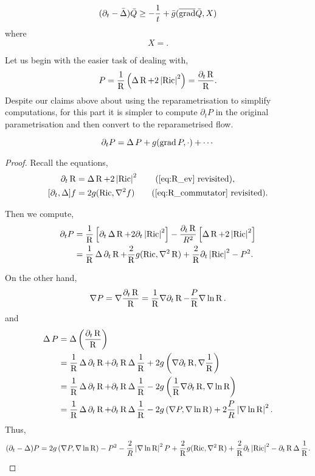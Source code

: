 \documentclass{amsart}
\begin{document}
\begin{prop}
\label{prop:Q_maxprinciple}
\[
(\partial_t - \bar{\Delta}) \bar{Q} \geq - \frac{1}{t} + \bar{g}(\overline{\operatorname{grad}} \bar{Q}, X)
\]
where
\[
X = .
\]
\end{prop}

Let us begin with the easier task of dealing with,
\[
P = \frac{1}{\operatorname{R}} \left(\operatorname{\Delta} \operatorname{R} + 2\left|{\operatorname{Ric}}\right|^2\right) = \frac{\partial_t \operatorname{R}}{\operatorname{R}}.
\]
Despite our claims above about using the reparametrisation to simplify computations, for this part it is simpler to compute \(\partial_t P\) in the original parametrisation and then convert to the reparametrised flow.

\begin{lemma}
\label{lem:dtP}
\[
\partial_t P = \operatorname{\Delta} P + g(\operatorname{grad} P, \cdot) + \cdots
\]
\end{lemma}

\begin{proof}
Recall the equations,
\begin{align*}
\partial_t \R &= \laplace \R + 2 \abs{\ric}^2 \tag{\ref{eq:R_ev} revisited}, \\
[\partial_t, \laplace] f &= 2 g(\ric, \nabla^2 f) \tag{\ref{eq:R_commutator} revisited}.
\end{align*}

Then we compute,
\[
\begin{split}
\partial_t P &= \frac{1}{\operatorname{R}} \left[\partial_t \operatorname{\Delta} \operatorname{R} + 2 \partial_t \left|{\operatorname{Ric}}\right|^2\right] - \frac{\partial_t \operatorname{R}}{R^2} \left[\operatorname{\Delta} \operatorname{R} + 2 \left|{\operatorname{Ric}}\right|^2\right] \\
&= \frac{1}{\operatorname{R}} \operatorname{\Delta} \partial_t \operatorname{R} + \frac{2}{\operatorname{R}} g(\operatorname{Ric}, \nabla^2 \operatorname{R}) + \frac{2}{\operatorname{R}} \partial_t \left|{\operatorname{Ric}}\right|^2 - P^2.
\end{split}
\]

On the other hand,
\[
\nabla P = \nabla \frac{\partial_t \operatorname{R}}{\operatorname{R}} = \frac{1}{\operatorname{R}} \nabla \partial_t \operatorname{R} - \frac{P}{\operatorname{R}} \nabla \ln \operatorname{R}.
\]
and
\[
\begin{split}
\operatorname{\Delta} P &= \operatorname{\Delta} \left(\frac{\partial_t \operatorname{R}}{\operatorname{R}}\right) \\
&= \frac{1}{\operatorname{R}} \operatorname{\Delta} \partial_t \operatorname{R} + \partial_t \operatorname{R} \operatorname{\Delta} \frac{1}{\operatorname{R}} + 2 g\left(\nabla \partial_t \operatorname{R}, \nabla \frac{1}{\operatorname{R}}\right) \\
&= \frac{1}{\operatorname{R}} \operatorname{\Delta} \partial_t \operatorname{R} + \partial_t \operatorname{R} \operatorname{\Delta} \frac{1}{\operatorname{R}} - 2 g\left(\frac{1}{\operatorname{R}} \nabla \partial_t \operatorname{R}, \nabla \ln \operatorname{R}\right) \\
&= \frac{1}{\operatorname{R}} \operatorname{\Delta} \partial_t \operatorname{R} + \partial_t \operatorname{R} \operatorname{\Delta} \frac{1}{\operatorname{R}} - 2 g\left(\nabla P, \nabla \ln \operatorname{R}\right) + 2\frac{P}{R} \left|{\nabla \ln \operatorname{R}}\right|^2.
\end{split}
\]
Thus,
\[
(\partial_t - \operatorname{\Delta}) P = 2 g\left(\nabla P, \nabla \ln \operatorname{R}\right) - P^2 - \frac{2}{R} \left|{\nabla \ln \operatorname{R}}\right|^2 P + \frac{2}{\operatorname{R}} g(\operatorname{Ric}, \nabla^2 \operatorname{R}) + \frac{2}{\operatorname{R}} \partial_t \left|{\operatorname{Ric}}\right|^2 - \partial_t \operatorname{R} \operatorname{\Delta} \frac{1}{\operatorname{R}}.
\]
\end{proof}
\end{document}
